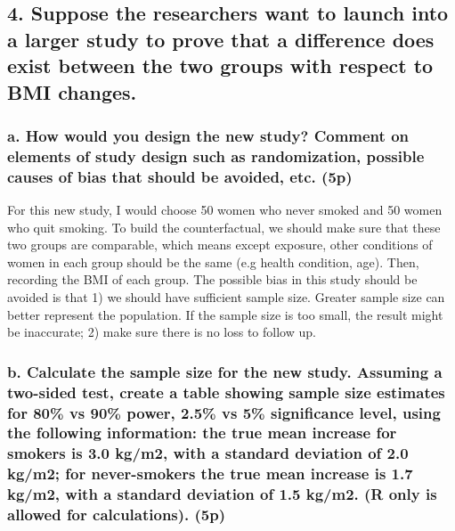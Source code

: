\documentclass[]{article}
\begin{document}
\subsection{4. Suppose the researchers want to launch into a larger
study to prove that a difference does exist between the two groups with
respect to BMI
changes.}\label{suppose-the-researchers-want-to-launch-into-a-larger-study-to-prove-that-a-difference-does-exist-between-the-two-groups-with-respect-to-bmi-changes.}

\subsubsection{a. How would you design the new study? Comment on
elements of study design such as randomization, possible causes of bias
that should be avoided, etc.
(5p)}\label{a.-how-would-you-design-the-new-study-comment-on-elements-of-study-design-such-as-randomization-possible-causes-of-bias-that-should-be-avoided-etc.-5p}

For this new study, I would choose 50 women who never smoked and 50
women who quit smoking. To build the counterfactual, we should make sure
that these two groups are comparable, which means except exposure, other
conditions of women in each group should be the same (e.g health
condition, age). Then, recording the BMI of each group. The possible
bias in this study should be avoided is that 1) we should have
sufficient sample size. Greater sample size can better represent the
population. If the sample size is too small, the result might be
inaccurate; 2) make sure there is no loss to follow up.

\subsubsection{b. Calculate the sample size for the new study. Assuming
a two-sided test, create a table showing sample size estimates for 80\%
vs 90\% power, 2.5\% vs 5\% significance level, using the following
information: the true mean increase for smokers is 3.0 kg/m2, with a
standard deviation of 2.0 kg/m2; for never-smokers the true mean
increase is 1.7 kg/m2, with a standard deviation of 1.5 kg/m2. (R only
is allowed for calculations).
(5p)}\label{b.-calculate-the-sample-size-for-the-new-study.-assuming-a-two-sided-test-create-a-table-showing-sample-size-estimates-for-80-vs-90-power-2.5-vs-5-significance-level-using-the-following-information-the-true-mean-increase-for-smokers-is-3.0-kgm2-with-a-standard-deviation-of-2.0-kgm2-for-never-smokers-the-true-mean-increase-is-1.7-kgm2-with-a-standard-deviation-of-1.5-kgm2.-r-only-is-allowed-for-calculations.-5p}
\end{document}
